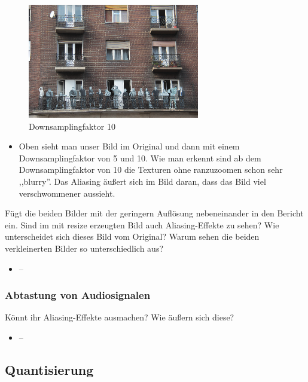 \documentclass[a4paper, 11pt]{article}
\begin{document}
\begin{figure} [h]
    \centering 
    \includegraphics[height = 5cm , width =0.5 \textwidth]{test_sliced10.png}
    \caption{Downsamplingfaktor 10}
    \label{fig : label7}
\end{figure} 
     
    \begin{itemize}
    \item Oben sieht man unser Bild im Original und dann mit einem Downsamplingfaktor von 5 und 10. Wie man erkennt sind ab dem Downsamplingfaktor von 10 die Texturen ohne ranzuzoomen schon sehr ,,blurry''. Das Aliasing äußert sich im Bild daran, dass das Bild viel verschwommener aussieht.
    \end{itemize}
Fügt die beiden Bilder mit der geringern Auflösung nebeneinander in den Bericht ein. Sind im mit resize erzeugten Bild auch Aliasing-Effekte zu sehen? Wie unterscheidet sich dieses Bild vom Original? Warum sehen die beiden verkleinerten Bilder so unterschiedlich aus?
    \begin{itemize}
    \item -- 
    \end{itemize}
    
\subsubsection{Abtastung von Audiosignalen}

Könnt ihr Aliasing-Effekte ausmachen? Wie äußern sich diese?
    \begin{itemize}
    \item -- 
    \end{itemize}

\subsection{Quantisierung}
\end{document}
